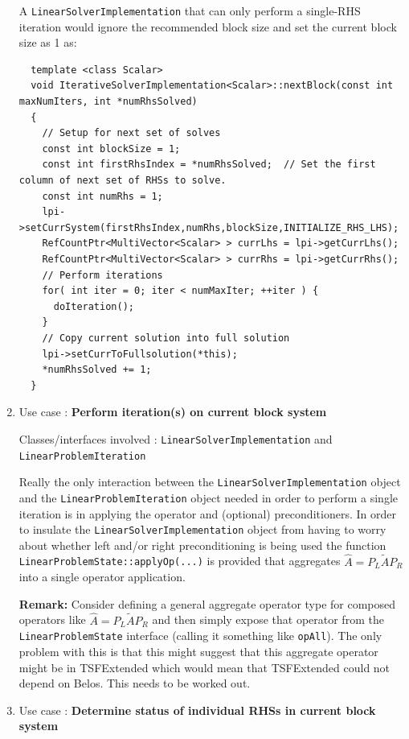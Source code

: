 \documentclass[pdf,ps2pdf,11pt]{SANDreport}
\begin{document}
\begin{enumerate}
A {}\texttt{Linear\-Solver\-Implementation} that can only perform a
single-RHS iteration would ignore the recommended block size and set
the current block size as 1 as:

{\scriptsize\begin{verbatim}
  template <class Scalar>
  void IterativeSolverImplementation<Scalar>::nextBlock(const int maxNumIters, int *numRhsSolved)
  {
    // Setup for next set of solves
    const int blockSize = 1;
    const int firstRhsIndex = *numRhsSolved;  // Set the first column of next set of RHSs to solve.
    const int numRhs = 1;
    lpi->setCurrSystem(firstRhsIndex,numRhs,blockSize,INITIALIZE_RHS_LHS);
    RefCountPtr<MultiVector<Scalar> > currLhs = lpi->getCurrLhs();
    RefCountPtr<MultiVector<Scalar> > currRhs = lpi->getCurrRhs();
    // Perform iterations
    for( int iter = 0; iter < numMaxIter; ++iter ) {
      doIteration();
    }
    // Copy current solution into full solution
    lpi->setCurrToFullsolution(*this);
    *numRhsSolved += 1;
  }
\end{verbatim}}

{}\item Use case : \textbf{Perform iteration(s) on current block
system}

{}\noindent{}Classes/interfaces involved :
{}\texttt{Linear\-Solver\-Implementation} and
{}\texttt{Linear\-Problem\-Iteration}

Really the only interaction between the
{}\texttt{Linear\-Solver\-Implementation} object and the
{}\texttt{Linear\-Problem\-Iteration} object needed in order to
perform a single iteration is in applying the operator and (optional)
preconditioners.  In order to insulate the
{}\texttt{Linear\-Solver\-Implementation} object from having to worry
about whether left and/or right preconditioning is being used the
function {}\texttt{Linear\-Problem\-State::\-apply\-Op(...)} is
provided that aggregates $\hat{A} = P_L \tilde{A} P_R$ into a single
operator application.

{}\noindent{}\textbf{Remark:} Consider defining a general aggregate
operator type for composed operators like $\hat{A} = P_L \tilde{A}
P_R$ and then simply expose that operator from the
{}\texttt{Linear\-Problem\-State} interface (calling it something like
{}\texttt{opAll}).  The only problem with this is that this might
suggest that this aggregate operator might be in TSFExtended which
would mean that TSFExtended could not depend on Belos.  This needs to
be worked out.

{}\item Use case : \textbf{Determine status of individual RHSs in 
current block system}


\end{enumerate}
\end{document}
